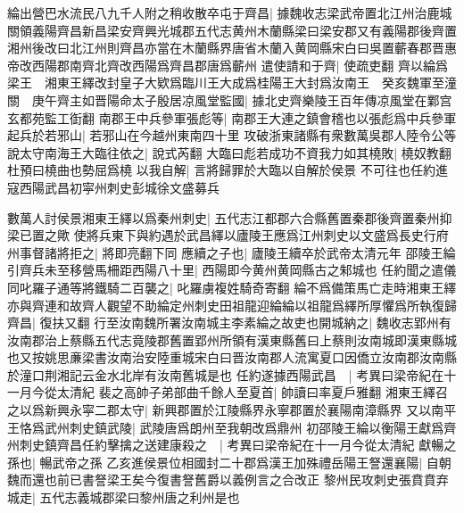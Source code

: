 綸出營巴水流民八九千人附之稍收散卒屯于齊昌|{
	據魏收志梁武帝置北江州治鹿城關領義陽齊昌新昌梁安齊興光城郡五代志黄州木蘭縣梁曰梁安郡又有義陽郡後齊置湘州後改曰北江州則齊昌亦當在木蘭縣界唐省木蘭入黄岡縣宋白曰吳置蘄春郡晋惠帝改西陽郡南齊北齊改西陽爲齊昌郡唐爲蘄州}
遣使請和于齊|{
	使疏吏翻}
齊以綸爲梁王　湘東王繹改封皇子大欵爲臨川王大成爲桂陽王大封爲汝南王　癸亥魏軍至潼關　庚午齊主如晋陽命太子殷居凉風堂監國|{
	據北史齊樂陵王百年傳凉風堂在鄴宫玄都苑監工衘翻}
南郡王中兵參軍張彪等|{
	南郡王大連之鎮會稽也以張彪爲中兵參軍}
起兵於若邪山|{
	若邪山在今越州東南四十里}
攻破浙東諸縣有衆數萬吳郡人陸令公等說太守南海王大臨往依之|{
	說式芮翻}
大臨曰彪若成功不資我力如其橈敗|{
	橈奴教翻杜預曰橈曲也勢屈爲橈}
以我自解|{
	言將歸罪於大臨以自解於侯景}
不可往也任約進寇西陽武昌初寜州刺史彭城徐文盛募兵

數萬人討侯景湘東王繹以爲秦州刺史|{
	五代志江都郡六合縣舊置秦郡後齊置秦州抑梁已置之歟}
使將兵東下與約遇於武昌繹以廬陵王應爲江州刺史以文盛爲長史行府州事督諸將拒之|{
	將即亮翻下同}
應續之子也|{
	廬陵王續卒於武帝太清元年}
邵陵王綸引齊兵未至移營馬柵距西陽八十里|{
	西陽即今黄州黄岡縣古之邾城也}
任約聞之遣儀同叱羅子通等將鐵騎二百襲之|{
	叱羅虜複姓騎奇寄翻}
綸不爲備策馬亡走時湘東王繹亦與齊連和故齊人觀望不助綸定州刺史田祖龍迎綸綸以祖龍爲繹所厚懼爲所執復歸齊昌|{
	復扶又翻}
行至汝南魏所署汝南城主李素綸之故吏也開城納之|{
	魏收志郢州有汝南郡治上蔡縣五代志竟陵郡舊置郢州所領有漢東縣舊曰上蔡則汝南城即漢東縣城也又按姚思亷梁書汝南治安陸重城宋白曰晋汝南郡人流寓夏口因僑立汝南郡汝南縣於潼口荆湘記云金水北岸有汝南舊城是也}
任約遂據西陽武昌　|{
	考異曰梁帝紀在十一月今從太清紀}
裴之高帥子弟部曲千餘人至夏首|{
	帥讀曰率夏戶雅翻}
湘東王繹召之以爲新興永寜二郡太守|{
	新興郡置於江陵縣界永寧郡置於襄陽南漳縣界}
又以南平王恪爲武州刺史鎮武陵|{
	武陵唐爲朗州至我朝改爲鼎州}
初邵陵王綸以衡陽王獻爲齊州刺史鎮齊昌任約擊擒之送建康殺之　|{
	考異曰梁帝紀在十一月今從太清紀}
獻暢之孫也|{
	暢武帝之孫}
乙亥進侯景位相國封二十郡爲漢王加殊禮岳陽王詧還襄陽|{
	自朝魏而還也前已書詧梁王矣今復書詧舊爵以義例言之合改正}
黎州民攻刺史張賁賁弃城走|{
	五代志義城郡梁曰黎州唐之利州是也}


